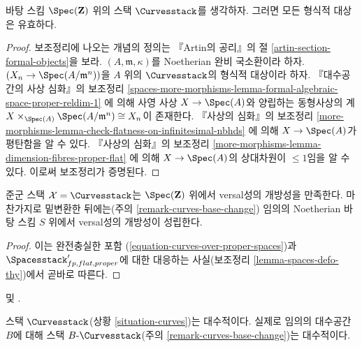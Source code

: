 \begin{lemma}
\label{lemma-curves-existence}
바탕 스킴 $\Spec(\mathbf{Z})$ 위의 스택 $\Curvesstack$를 생각하자.
그러면 모든 형식적 대상은 유효하다.
\end{lemma}

\begin{proof}
보조정리에 나오는 개념의 정의는 『Artin의 공리』의 절
\ref{artin-section-formal-objects}을 보라. $(A, \mathfrak m, \kappa)$를
Noetherian 완비 국소환이라 하자. $(X_n \to \Spec(A/\mathfrak m^n))$을
$A$ 위의 $\Curvesstack$의 형식적 대상이라 하자. 『대수공간의 사상 심화』의
보조정리
\ref{spaces-more-morphisms-lemma-formal-algebraic-space-proper-reldim-1}
에 의해 사영 사상 $X \to \Spec(A)$와 양립하는 동형사상의 계
$X \times_{\Spec(A)} \Spec(A/\mathfrak m^n) \cong X_n$이 존재한다.
『사상의 심화』의 보조정리
\ref{more-morphisms-lemma-check-flatness-on-infinitesimal-nbhds}
에 의해 $X \to \Spec(A)$가 평탄함을 알 수 있다. 『사상의 심화』의 보조정리
\ref{more-morphisms-lemma-dimension-fibres-proper-flat}
에 의해 $X \to \Spec(A)$의 상대차원이 $\leq 1$임을 알 수 있다.
이로써 보조정리가 증명된다.
\end{proof}

\begin{lemma}
\label{lemma-curves-defo-thy}
준군 스택 $\mathcal{X} = \Curvesstack$는 $\Spec(\mathbf{Z})$ 위에서 versal성의
개방성을 만족한다. 마찬가지로 밑변환한 뒤에는(주의
\ref{remark-curves-base-change}) 임의의 Noetherian 바탕 스킴 $S$ 위에서
versal성의 개방성이 성립한다.
\end{lemma}

\begin{proof}
이는 완전충실한 포함 (\ref{equation-curves-over-proper-spaces})과
$\Spacesstack'_{fp, flat, proper}$에 대한 대응하는 사실(보조정리
\ref{lemma-spaces-defo-thy})에서 곧바로 따른다.
\end{proof}

\begin{theorem}
\label{theorem-curves-algebraic}
\begin{reference}
\cite[Proposition 3.3, page 8]{dJHS} 및
\cite[Appendix B by Jack Hall, Theorem B.1]{Smyth}.
\end{reference}
스택 $\Curvesstack$(상황 \ref{situation-curves})는 대수적이다. 실제로 임의의
대수공간 $B$에 대해 스택 $B\text{-}\Curvesstack$(주의
\ref{remark-curves-base-change})는 대수적이다.
\end{theorem}

